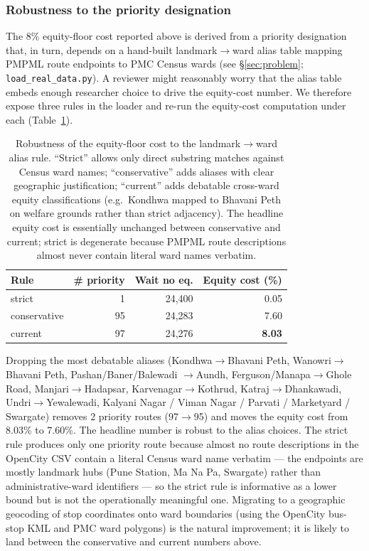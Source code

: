 \documentclass[a4paper,twoside]{article}
\begin{document}
\subsubsection*{Robustness to the priority designation}
\label{sec:equity-sensitivity}

The 8\% equity-floor cost reported above is derived from a
priority designation that, in turn, depends on a hand-built
landmark$\rightarrow$ward alias table mapping PMPML route
endpoints to PMC Census wards (see
\S\ref{sec:problem}; \texttt{load\_real\_data.py}). A reviewer
might reasonably worry that the alias table embeds enough
researcher choice to drive the equity-cost number. We therefore
expose three rules in the loader and re-run the equity-cost
computation under each (Table~\ref{tab:equity_sens}).

\begin{table}[h]
\caption{Robustness of the equity-floor cost to the
landmark$\rightarrow$ward alias rule. ``Strict'' allows only
direct substring matches against Census ward names; ``conservative''
adds aliases with clear geographic justification; ``current'' adds
debatable cross-ward equity classifications (e.g.\ Kondhwa
mapped to Bhavani Peth on welfare grounds rather than strict
adjacency). The headline equity cost is essentially unchanged
between conservative and current; strict is degenerate because
PMPML route descriptions almost never contain literal ward names
verbatim.}\label{tab:equity_sens}
\centering\scriptsize
\begin{tabular}{@{}lrrr@{}}
\toprule
\textbf{Rule} & \textbf{\# priority} & \textbf{Wait no eq.} &
\textbf{Equity cost (\%)} \\
\midrule
strict       &   1 & 24{,}400 & 0.05 \\
conservative &  95 & 24{,}283 & 7.60 \\
current      &  97 & 24{,}276 & \textbf{8.03} \\
\bottomrule
\end{tabular}
\end{table}

Dropping the most debatable aliases (Kondhwa$\rightarrow$Bhavani
Peth, Wanowri$\rightarrow$Bhavani Peth, Pashan/Baner/Balewadi
$\rightarrow$Aundh, Ferguson/Manapa$\rightarrow$Ghole Road,
Manjari$\rightarrow$Hadapsar, Karvenagar$\rightarrow$Kothrud,
Katraj$\rightarrow$Dhankawadi, Undri$\rightarrow$Yewalewadi,
Kalyani Nagar / Viman Nagar / Parvati / Marketyard / Swargate)
removes 2 priority routes (97$\rightarrow$95) and moves the
equity cost from 8.03\% to 7.60\%. The headline number is robust
to the alias choices. The strict rule produces only one priority
route because almost no route descriptions in the OpenCity CSV
contain a literal Census ward name verbatim --- the endpoints
are mostly landmark hubs (Pune Station, Ma Na Pa, Swargate)
rather than administrative-ward identifiers --- so the strict
rule is informative as a lower bound but is not the operationally
meaningful one. Migrating to a geographic geocoding of stop
coordinates onto ward boundaries (using the OpenCity bus-stop
KML and PMC ward polygons) is the natural improvement; it is
likely to land between the conservative and current numbers
above.
\end{document}
